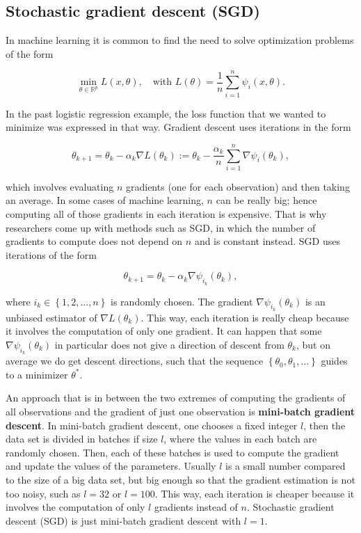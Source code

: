\subsection{Stochastic gradient descent (SGD)}

In machine learning it is common to find the need to solve optimization problems of the form

\begin{equation}
  \min_{\theta \in \mathbb{R}^p} L(x, \theta), \quad \text{with} \, \,
  L(\theta) = \frac{1}{n} \sum_{i = 1}^n { \psi_i(x, \theta) }.
\end{equation}

In the past logistic regression example, the loss function that we wanted to minimize was expressed in that way. Gradient descent uses iterations in the form

\[
  \theta_{k+1} = \theta_k - \alpha_k \nabla L(\theta_k) :=\theta_k - \frac{\alpha_k}{n} \sum_{i = 1}^n \nabla \psi_i(\theta_k),
\]

which involves evaluating $n$ gradients (one for each observation) and then taking an average. In some cases of machine learning, $n$ can be really big; hence computing all of those gradients in each iteration is expensive. That is why researchers come up with methods such as SGD, in which the number of gradients to compute does not depend on $n$ and is constant instead. SGD uses iterations of the form

\[
  \theta_{k+1} = \theta_k - \alpha_k \nabla \psi_{i_k}(\theta_k),
\]

where $i_k \in \left\{1, 2, ..., n \right\}$ is randomly chosen. The gradient $\nabla \psi_{i_k}(\theta_k)$ is an unbiased estimator of $\nabla L(\theta_k)$. This way, each iteration is really cheap because it involves the computation of only one gradient. It can happen that some $\nabla \psi_{i_k}(\theta_k)$ in particular does not give a direction of descent from $\theta_k$, but on average we do get descent directions, such that the sequence $\left\{ \theta_0, \theta_1, ... \right\}$ guides to a minimizer $\theta^*$.

An approach that is in between the two extremes of computing the gradients of all observations and the gradient of just one observation is \textbf{mini-batch gradient descent}. In mini-batch gradient descent, one chooses a fixed integer $l$, then the data set is divided in batches if size $l$, where the values in each batch are randomly chosen. Then, each of these batches is used to compute the gradient and update the values of the parameters. Usually $l$ is a small number compared to the size of a big data set, but big enough so that the gradient estimation is not too noisy, such as $l = 32$ or $l = 100$. This way, each iteration is cheaper because it involves the computation of only $l$ gradients instead of $n$. Stochastic gradient descent (SGD) is just mini-batch gradient descent with $l = 1$.

